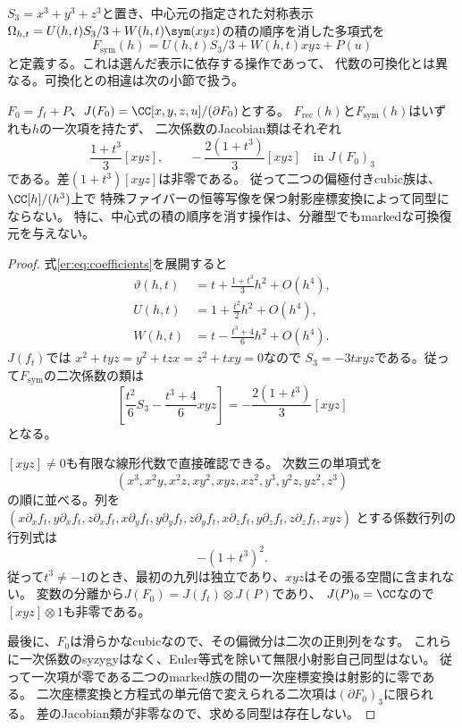 $S_3=x^3+y^3+z^3$と置き、中心元の指定された対称表示
$\Omega_{h,t}=U(h,t)S_3/3+W(h,t)\sym(xyz)$の積の順序を消した多項式を
\[
 F_{\mathrm{sym}}(h)=U(h,t)S_3/3+W(h,t)xyz+P(u)
\]
と定義する。これは選んだ表示に依存する操作であって、
代数の可換化とは異なる。可換化との相違は次の小節で扱う。

\begin{proposition}[二次Jacobian類の不一致]
\label{em:prop:second-order-failure}
$F_0=f_t+P$、$J(F_0)=\CC[x,y,z,u]/(\partial F_0)$とする。
$F_{\mathrm{rec}}(h)$と$F_{\mathrm{sym}}(h)$はいずれも$h$の一次項を持たず、
二次係数のJacobian類はそれぞれ
\begin{equation}\label{em:eq:two-classes}
 \frac{1+t^3}{3}[xyz],\qquad
 -\frac{2(1+t^3)}{3}[xyz]
 \quad\text{in }J(F_0)_3
\end{equation}
である。差$(1+t^3)[xyz]$は非零である。
従って二つの偏極付きcubic族は、$\CC[h]/(h^3)$上で
特殊ファイバーの恒等写像を保つ射影座標変換によって同型にならない。
特に、中心式の積の順序を消す操作は、分離型でもmarkedな可換復元を与えない。
\end{proposition}
\begin{proof}
式\eqref{er:eq:coefficients}を展開すると
\begin{align*}
 \vartheta(h,t)&=t+\frac{1+t^3}{3}h^2+O(h^4),\\
 U(h,t)&=1+\frac{t^2}{2}h^2+O(h^4),\\
 W(h,t)&=t-\frac{t^3+4}{6}h^2+O(h^4).
\end{align*}
$J(f_t)$では
$x^2+tyz=y^2+tzx=z^2+txy=0$なので
$S_3=-3txyz$である。従って$F_{\mathrm{sym}}$の二次係数の類は
\[
 \left[\frac{t^2}{6}S_3-\frac{t^3+4}{6}xyz\right]
 =-\frac{2(1+t^3)}{3}[xyz]
\]
となる。

$[xyz]\ne0$も有限な線形代数で直接確認できる。
次数三の単項式を
\[
 (x^3,x^2y,x^2z,xy^2,xyz,xz^2,y^3,y^2z,yz^2,z^3)
\]
の順に並べる。列を
$(x\partial_xf_t,y\partial_xf_t,z\partial_xf_t,
x\partial_yf_t,y\partial_yf_t,z\partial_yf_t,
x\partial_zf_t,y\partial_zf_t,z\partial_zf_t,xyz)$
とする係数行列の行列式は
\[
 -(1+t^3)^2.
\]
従って$t^3\ne-1$のとき、最初の九列は独立であり、$xyz$はその張る空間に含まれない。
変数の分離から$J(F_0)=J(f_t)\otimes J(P)$であり、
$J(P)_0=\CC$なので$[xyz]\otimes1$も非零である。

最後に、$F_0$は滑らかなcubicなので、その偏微分は二次の正則列をなす。
これらに一次係数のsyzygyはなく、Euler等式を除いて無限小射影自己同型はない。
従って一次項が零である二つのmarked族の間の一次座標変換は射影的に零である。
二次座標変換と方程式の単元倍で変えられる二次項は$(\partial F_0)_3$に限られる。
差のJacobian類が非零なので、求める同型は存在しない。
\end{proof}

